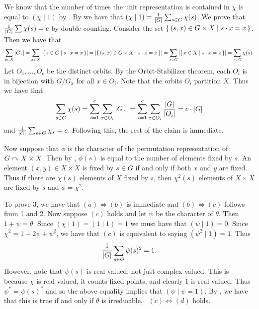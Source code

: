 \documentclass[letterpaper, 11pt, oneside]{book}
\begin{document}
\begin{pf}
  We know that the number of times the unit representation is contained in $\chi$ is equal to $(\chi \mid 1)$ by .
  By  we have that $(\chi \mid 1) = \frac{1}{\abs{G}} \sum_{s \in G} \chi(s)$.
  We prove that $\frac{1}{\abs{G}} \sum \chi(s) = c$ by double counting.
  Consider the set $\set{(s, x) \in G \times X | s \cdot x = x}$.
  Then we have that
  \[
    \sum_{x \in X} \abs{G_{x}} = \sum_{x \in X} \abs{\set{s \in G | s \cdot x = x}} = \abs{\set{(s, x) \in G \times X | s \cdot x = x}} = \sum_{s \in G} \abs{\set{x \in X | s \cdot x = x}} = \sum_{s \in G} \chi(s).
  \]
  Let $O_{1}, \ldots, O_{c}$ be the distinct orbits.
  By the Orbit-Stabilizer theorem, each $O_{i}$ is in bijection with $G / G_{x}$ for all $x \in O_{i}$.
  Note that the orbits $O_{i}$ partition $X$.
  Thus we have that
  \[
    \sum_{s \in G} \chi(s) = \sum_{i = 1}^{c} \sum_{x \in O_{i}} \abs{G_{x}} = \sum_{i = 1}^{c} \sum_{x \in O_{i}} \frac{\abs{G}}{\abs{O_{i}}} = c \cdot \abs{G}
  \]
  and $\frac{1}{\abs{G}} \sum_{s \in G} \chi_{s} = c$.
  Following this, the rest of the claim is immediate.

  Now suppose that $\phi$ is the character of the permutation representation of $G \curvearrowright X \times X$.
  Then by , $\phi(s)$ is equal to the number of elements fixed by $s$.
  An element $(x, y) \in X \times X$ is fixed by $s \in G$ if and only if both $x$ and $y$ are fixed.
  Thus if there are $\chi(s)$ elements of $X$ fixed by $s$, then $\chi^{2}(s)$ elements of $X \times X$ are fixed by $s$ and $\phi = \chi^{2}$.

  To prove 3, we have that $(a) \iff (b)$ is immediate and $(b) \iff (c)$ follows from 1 and 2.
  Now suppose $(c)$ holds and let $\psi$ be the character of $\theta$.
  Then $1 + \psi = \theta$.
  Since $(\chi \mid 1) = (1 \mid 1) = 1$ we must have that $(\psi \mid 1) = 0$.
  Since $\chi^{2} = 1 + 2\psi + \psi^{2}$, we have that $(c)$ is equivalent to saying $(\psi^{2} \mid 1) = 1$.
  Thus
  \[
    \frac{1}{\abs{G}} \sum_{s \in G} \psi(s)^{2} = 1.
  \]
  However, note that $\psi(s)$ is real valued, not just complex valued.
  This is because $\chi$ is real valued, it counts fixed points, and clearly $1$ is real valued.
  Thus $\psi^{*} = \psi(s)^{*}$ and so the above equality implies that $(\psi \mid \psi = 1)$.
  By , we have that this is true if and only if $\theta$ is irreducible, \ie\ $(c) \iff (d)$ holds.
\end{pf}
\end{document}
